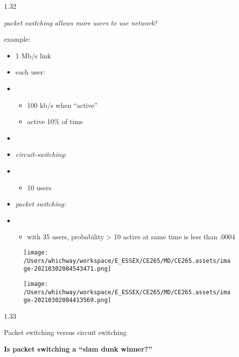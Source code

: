 \documentclass[
]{article}
\begin{document}
1.32

\emph{packet switching allows more users to use network!}

example:

\begin{itemize}
\item
  1 Mb/s link
\item
  each user:
\item
  \begin{itemize}
  \item
    100 kb/s when ``active''
  \item
    active 10\% of time
  \end{itemize}
\item
\item
  \emph{circuit-switching:}
\item
  \begin{itemize}
  \item
    10 users
  \end{itemize}
\item
  \emph{packet switching:}
\item
  \begin{itemize}
  \item
    with 35 users, probability \textgreater{} 10 active at same time is
    less than .0004
  \end{itemize}
\end{itemize}

\begin{figure}
\centering
\texttt{[image: /Users/whichway/workspace/E\_ESSEX/CE265/MD/CE265.assets/image-20210302084543471.png]}
\caption{}
\end{figure}

\begin{figure}
\centering
\texttt{[image: /Users/whichway/workspace/E\_ESSEX/CE265/MD/CE265.assets/image-20210302084413569.png]}
\caption{}
\end{figure}

1.33

Packet switching versus circuit switching

\textbf{Is packet switching a ``slam dunk winner?''}
\end{document}
